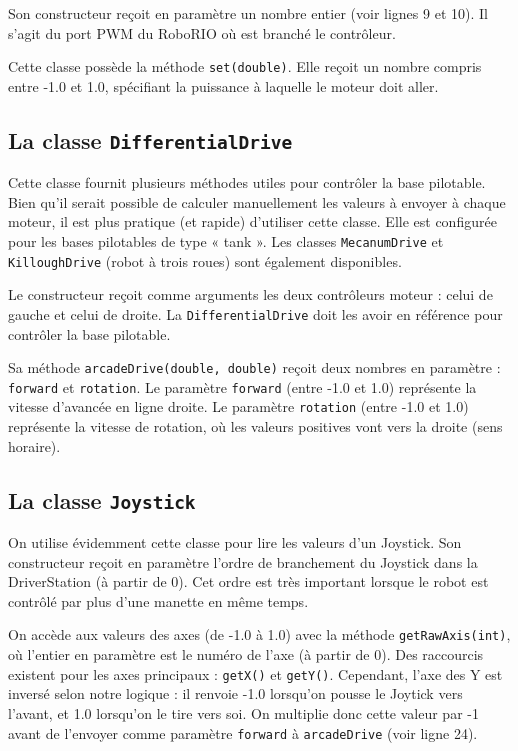 \documentclass[12pt]{report}
\begin{document}
Son constructeur reçoit en paramètre un nombre entier (voir lignes 9 et 10). Il s'agit du port PWM du RoboRIO où est branché le contrôleur.

Cette classe possède la méthode \texttt{set(double)}. Elle reçoit un nombre compris entre -1.0 et 1.0, spécifiant la puissance à laquelle le moteur doit aller.

\subsection{La classe \texttt{DifferentialDrive}}

Cette classe fournit plusieurs méthodes utiles pour contrôler la base pilotable. Bien qu'il serait possible de calculer manuellement les valeurs à envoyer à chaque moteur, il est plus pratique (et rapide) d'utiliser cette classe. Elle est configurée pour les bases pilotables de type « tank ». Les classes \texttt{MecanumDrive} et \texttt{KilloughDrive} (robot à trois roues) sont également disponibles.

Le constructeur reçoit comme arguments les deux contrôleurs moteur : celui de gauche et celui de droite. La \texttt{DifferentialDrive} doit les avoir en référence pour contrôler la base pilotable.

Sa méthode \texttt{arcadeDrive(double, double)} reçoit deux nombres en paramètre : \texttt{forward} et \texttt{rotation}. Le paramètre \texttt{forward} (entre -1.0 et 1.0) représente la vitesse d'avancée en ligne droite. Le paramètre \texttt{rotation} (entre -1.0 et 1.0) représente la vitesse de rotation, où les valeurs positives vont vers la droite (sens horaire). 

\subsection{La classe \texttt{Joystick}}

On utilise évidemment cette classe pour lire les valeurs d'un Joystick. Son constructeur reçoit en paramètre l'ordre de branchement du Joystick dans la DriverStation (à partir de 0). Cet ordre est très important lorsque le robot est contrôlé par plus d'une manette en même temps.

On accède aux valeurs des axes (de -1.0 à 1.0) avec la méthode \texttt{getRawAxis(int)}, où l'entier en paramètre est le numéro de l'axe (à partir de 0). Des raccourcis existent pour les axes principaux : \texttt{getX()} et \texttt{getY()}. Cependant, l'axe des Y est inversé selon notre logique : il renvoie -1.0 lorsqu'on pousse le Joytick vers l'avant, et 1.0 lorsqu'on le tire vers soi. On multiplie donc cette valeur par -1 avant de l'envoyer comme paramètre \texttt{forward} à \texttt{arcadeDrive} (voir ligne 24).
\end{document}
